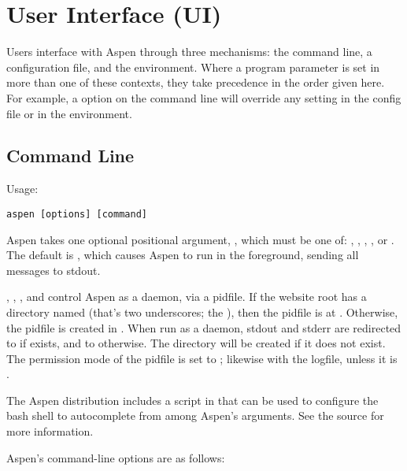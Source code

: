 \chapter{User Interface (UI) \label{interface}}

Users interface with Aspen through three mechanisms: the command line, a
configuration file, and the environment. Where a program parameter is set in
more than one of these contexts, they take precedence in the order given here.
For example, a  option on the command line will override any
 setting in the config file or in the environment.


\section{Command Line \label{command-line}}

Usage:

\begin{verbatim}
aspen [options] [command]
\end{verbatim}

Aspen takes one optional positional argument, , which must be one
of: , , , , or .
The default is , which causes Aspen to run in the foreground,
sending all messages to stdout.

, , , and  control Aspen as a
daemon, via a pidfile. If the website root has a directory named \file{__}
(that's two underscores; the ), then the pidfile is at
. Otherwise, the pidfile is created in . When
run as a daemon, stdout and stderr are redirected to  if
\file{__} exists, and to  otherwise. The  directory
will be created if it does not exist. The permission mode of the pidfile is set
to ; likewise with the logfile, unless it is .

The Aspen distribution includes a script in 
that can be used to configure the bash shell to autocomplete from among Aspen's
arguments. See the source for more information.

Aspen's command-line options are as follows:

